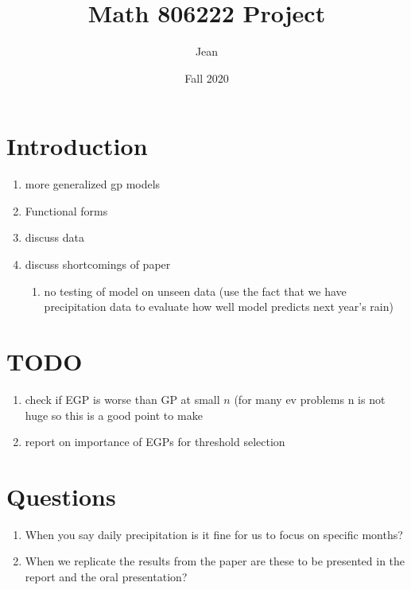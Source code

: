 \documentclass{article}
\title{Math 806222 Project}
\author{Jean }
\date{Fall 2020}
\theoremstyle{definition}
\theoremstyle{definition}
\begin{document}
\maketitle
\tableofcontents{}
\pagebreak
\section{Introduction}
\begin{enumerate}
    \item more generalized gp models
    \item Functional forms 
    \item discuss data 
    \item discuss shortcomings of paper
    \begin{enumerate}
        \item no testing of model on unseen data (use the fact that we have precipitation data to evaluate how well model predicts next year's rain)
    \end{enumerate}
\end{enumerate}

\section{TODO}
\begin{enumerate}
    \item check if EGP is worse than GP at small $n$ (for many ev problems n is not huge so this is a good point to make
    \item report on importance of EGPs for threshold selection
\end{enumerate}

\section{Questions }
\begin{enumerate}
    \item When you say daily precipitation is it fine for us to focus on specific months?
    \item When we replicate the results from the paper are these to be presented in the report and the oral presentation?
\end{enumerate}
\end{document}
